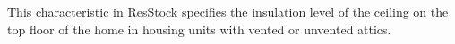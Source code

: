 This characteristic in ResStock specifies the insulation level of the ceiling on the top floor of the home in housing units with vented or unvented attics.
